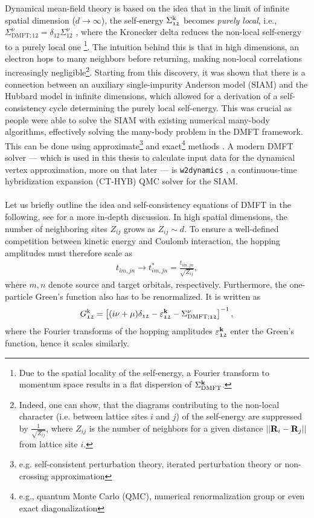 \documentclass[../../main.tex]{subfiles}
\begin{document}
Dynamical mean-field theory is based on the idea that in the limit of infinite spatial dimension ($d\to\infty$), the self-energy $\Sigma_{\mathfrak{12}}^{\text{k}}$ becomes \textit{purely local}, i.e., $\Sigma_{\text{DMFT};\mathfrak{12}}^{\nu}=\delta_{\mathfrak{12}}\Sigma_{\mathfrak{12}}^{\nu}$ \cite{metzner vollhardt d to infty}, where the Kronecker delta reduces the non-local self-energy to a purely local one \footnote{Due to the spatial locality of the self-energy, a Fourier transform to momentum space results in a flat dispersion of $\Sigma_{\text{DMFT}}^{\textbf{k}}$.}. The intuition behind this is that in high dimensions, an electron hops to many neighbors before returning, making non-local correlations increasingly negligible\footnote{Indeed, one can show, that the diagrams contributing to the non-local character (i.e. between lattice sites $i$ and $j$) of the self-energy are suppressed by $\frac{1}{\sqrt{Z_{ij}}}$, where $Z_{ij}$ is the number of neighbors for a given distance $||\textbf{R}_i-\textbf{R}_j||$ from lattice site $i$.}. Starting from this discovery, it was shown \cite{georges kotliar hubbard infty dim} that there is a connection between an auxiliary single-impurity Anderson model (SIAM) and the Hubbard model in infinite dimensions, which allowed for a derivation of a self-consistency cycle determining the purely local self-energy. This was crucial as people were able to solve the SIAM with existing numerical many-body algorithms, effectively solving the many-body problem in the DMFT framework. This can be done using approximate\footnote{e.g. self-consistent perturbation theory, iterated perturbation theory or non-crossing approximation} and exact\footnote{e.g., quantum Monte Carlo (QMC), numerical renormalization group or even exact diagonalization} methods \cite{held dmft}. A modern DMFT solver --- which is used in this thesis to calculate input data for the dynamical vertex approximation, more on that later --- is \texttt{w2dynamics} \cite{wallerberger w2dyn}, a continuous-time hybridization expansion (CT-HYB) QMC solver for the SIAM.
\\\\
Let us briefly outline the idea and self-consistency equations of DMFT in the following, see \cite{held dmft} for a more in-depth discussion. In high spatial dimensions, the number of neighboring sites $Z_{ij}$ grows as $Z_{ij}\sim d$. To ensure a well-defined competition between kinetic energy and Coulomb interaction, the hopping amplitudes must therefore scale as
\begin{align}
	t_{im,jn}\to t_{im,jn}^{*}=\frac{t_{im,jn}}{\sqrt{Z_{ij}}},
\end{align}
where $m,n$ denote source and target orbitals, respectively. Furthermore, the one-particle Green's function also has to be renormalized. It is written as
\begin{align}
	G_{\mathfrak{12}}^{\text{k}}=\left [(i\nu+\mu)\delta_{\mathfrak{12}}-\varepsilon^{\textbf{k}}_{\mathfrak{12}}-\Sigma_{\text{DMFT};\mathfrak{12}}^{\nu}\right ]^{-1},
\end{align}
where the Fourier transforms of the hopping amplitudes $\varepsilon^{\textbf{k}}_{\mathfrak{12}}$ enter the Green's function, hence it scales similarly.
\end{document}

